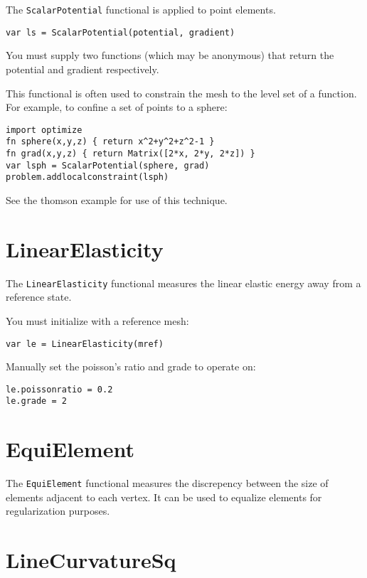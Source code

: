 The \texttt{ScalarPotential} functional is applied to point elements.

\begin{lstlisting}
var ls = ScalarPotential(potential, gradient)
\end{lstlisting}

You must supply two functions (which may be anonymous) that return the
potential and gradient respectively.

This functional is often used to constrain the mesh to the level set of
a function. For example, to confine a set of points to a sphere:

\begin{lstlisting}
import optimize
fn sphere(x,y,z) { return x^2+y^2+z^2-1 }
fn grad(x,y,z) { return Matrix([2*x, 2*y, 2*z]) }
var lsph = ScalarPotential(sphere, grad)
problem.addlocalconstraint(lsph)
\end{lstlisting}

See the thomson example for use of this technique.

\hypertarget{linearelasticity}{%
\section{LinearElasticity}\label{linearelasticity}}

The \texttt{LinearElasticity} functional measures the linear elastic
energy away from a reference state.

You must initialize with a reference mesh:

\begin{lstlisting}
var le = LinearElasticity(mref)
\end{lstlisting}

Manually set the poisson's ratio and grade to operate on:

\begin{lstlisting}
le.poissonratio = 0.2
le.grade = 2
\end{lstlisting}

\hypertarget{equielement}{%
\section{EquiElement}\label{equielement}}

The \texttt{EquiElement} functional measures the discrepency between the
size of elements adjacent to each vertex. It can be used to equalize
elements for regularization purposes.

\hypertarget{linecurvaturesq}{%
\section{LineCurvatureSq}\label{linecurvaturesq}}

